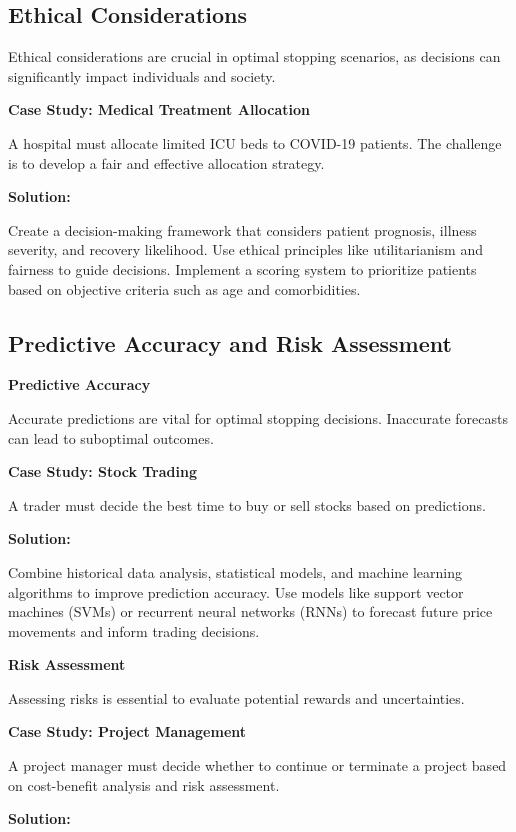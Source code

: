 \documentclass[12pt]{book} %
\begin{document}
\subsection{Ethical Considerations}

Ethical considerations are crucial in optimal stopping scenarios, as decisions can significantly impact individuals and society. 

\textbf{Case Study: Medical Treatment Allocation}

A hospital must allocate limited ICU beds to COVID-19 patients. The challenge is to develop a fair and effective allocation strategy.

\textbf{Solution:}

Create a decision-making framework that considers patient prognosis, illness severity, and recovery likelihood. Use ethical principles like utilitarianism and fairness to guide decisions. Implement a scoring system to prioritize patients based on objective criteria such as age and comorbidities.

\subsection{Predictive Accuracy and Risk Assessment}

\textbf{Predictive Accuracy}

Accurate predictions are vital for optimal stopping decisions. Inaccurate forecasts can lead to suboptimal outcomes.

\textbf{Case Study: Stock Trading}

A trader must decide the best time to buy or sell stocks based on predictions.

\textbf{Solution:}

Combine historical data analysis, statistical models, and machine learning algorithms to improve prediction accuracy. Use models like support vector machines (SVMs) or recurrent neural networks (RNNs) to forecast future price movements and inform trading decisions.

\textbf{Risk Assessment}

Assessing risks is essential to evaluate potential rewards and uncertainties.

\textbf{Case Study: Project Management}

A project manager must decide whether to continue or terminate a project based on cost-benefit analysis and risk assessment.

\textbf{Solution:}
\end{document}
